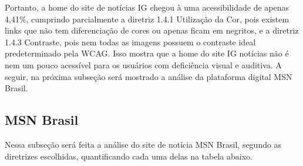 \documentclass[a4paper]{article}
\begin{document}
\begin{titlepage}
Portanto, a home do site de notícias IG chegou à uma acessibilidade de apenas 4,41\%, cumprindo parcialmente a diretriz 1.4.1 Utilização da Cor, pois existem links que não tem diferenciação de cores ou apenas ficam em negritos, e a diretriz 1.4.3 Contraste, pois nem todas as imagens possuem o contraste ideal predeterminado pela WCAG. Isso mostra que a home do site IG notícias não é nem um pouco acessível para os usuários com deficiência visual e auditiva. A seguir, na próxima subseção será mostrado a análise da plataforma digital MSN Brasil.

\subsection{MSN Brasil}

Nessa subseção será feita a análise do site de notícia MSN Brasil, segundo as diretrizes escolhidas, quantificando cada uma delas na tabela abaixo.\\


\end{titlepage}
\end{document}
